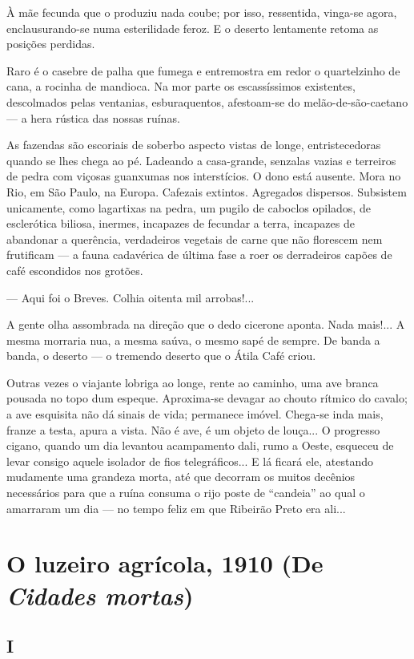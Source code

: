 À mãe fecunda que o produziu nada coube; por isso, ressentida, vinga-se
agora, enclausurando-se numa esterilidade feroz. E o deserto lentamente
retoma as posições perdidas.

Raro é o casebre de palha que fumega e entremostra em redor o
quartelzinho de cana, a rocinha de mandioca. Na mor parte os
escassíssimos existentes, descolmados pelas ventanias, esburaquentos,
afestoam-se do melão-de-são-caetano --- a hera rústica das nossas
ruínas.

As fazendas são escoriais de soberbo aspecto vistas de longe,
entristecedoras quando se lhes chega ao pé. Ladeando a casa-grande,
senzalas vazias e terreiros de pedra com viçosas guanxumas nos
interstícios. O dono está ausente. Mora no Rio, em São Paulo, na Europa.
Cafezais extintos. Agregados dispersos. Subsistem unicamente, como
lagartixas na pedra, um pugilo de caboclos opilados, de esclerótica
biliosa, inermes, incapazes de fecundar a terra, incapazes de abandonar
a querência, verdadeiros vegetais de carne que não florescem nem
frutificam --- a fauna cadavérica de última fase a roer os derradeiros
capões de café escondidos nos grotões.

--- Aqui foi o Breves. Colhia oitenta mil arrobas!...

A gente olha assombrada na direção que o dedo cicerone aponta. Nada
mais!... A mesma morraria nua, a mesma saúva, o mesmo sapé de sempre. De
banda a banda, o deserto --- o tremendo deserto que o Átila Café criou.

Outras vezes o viajante lobriga ao longe, rente ao caminho, uma ave
branca pousada no topo dum espeque. Aproxima-se devagar ao chouto
rítmico do cavalo; a ave esquisita não dá sinais de vida; permanece
imóvel. Chega-se inda mais, franze a testa, apura a vista. Não é ave, é
um objeto de louça... O progresso cigano, quando um dia levantou
acampamento dali, rumo a Oeste, esqueceu de levar consigo aquele
isolador de fios telegráficos... E lá ficará ele, atestando mudamente
uma grandeza morta, até que decorram os muitos decênios necessários para
que a ruína consuma o rijo poste de ``candeia'' ao qual o amarraram um
dia --- no tempo feliz em que Ribeirão Preto era ali...

\chapter{O luzeiro agrícola, 1910 (De \emph{Cidades mortas})}

\section{I}

